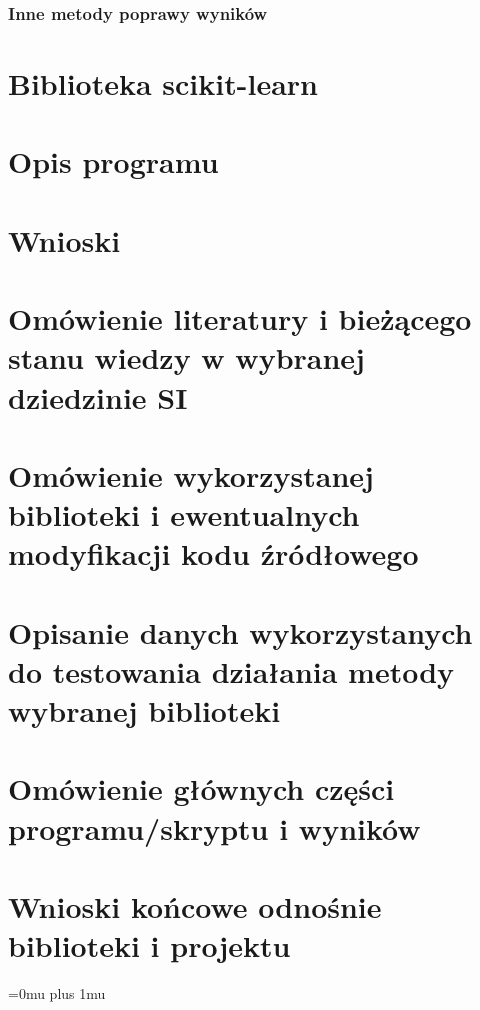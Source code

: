 \documentclass[10pt,a4paper]{article}
\begin{document}
\subsubsection{Inne metody poprawy wyników}


\section{Biblioteka scikit-learn}

\section{Opis programu}

\section{Wnioski}

\section{Omówienie literatury i bieżącego stanu wiedzy w wybranej dziedzinie SI}

\section{Omówienie wykorzystanej biblioteki i ewentualnych modyfikacji kodu źródłowego}

\section{Opisanie danych wykorzystanych do testowania działania metody wybranej biblioteki}

\section{Omówienie głównych części programu/skryptu i wyników}

\section{Wnioski końcowe odnośnie biblioteki i projektu}

\Urlmuskip=0mu plus 1mu\relax
{}

\end{document}
